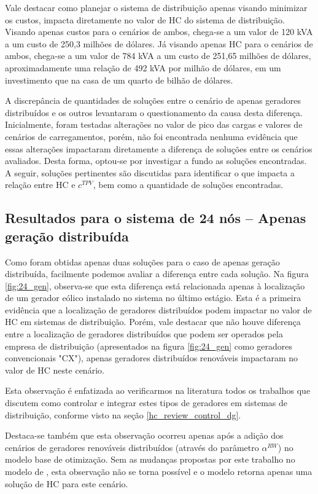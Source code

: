 Vale destacar como planejar o sistema de distribuição apenas visando minimizar os custos, impacta diretamente no valor de \ac{HC} do sistema de distribuição. Visando apenas custos para o cenários de ambos, chega-se a um valor de 120 kVA a um custo de 250,3 milhões de dólares. Já visando apenas \ac{HC} para o cenários de ambos, chega-se a um valor de 784 kVA a um custo de 251,65 milhões de dólares, aproximadamente uma relação de 492 kVA por milhão de dólares, em um investimento que na casa de um quarto de bilhão de dólares.


A discrepância de quantidades de soluções entre o cenário de apenas geradores distribuídos e os outros levantaram o questionamento da causa desta diferença. Inicialmente, foram testadas alterações no valor de pico das cargas e valores de cenários de carregamentos, porém, não foi encontrada nenhuma evidência que essas alterações impactaram diretamente a diferença de soluções entre os cenários avaliados. Desta forma, optou-se por investigar a fundo as soluções encontradas. A seguir, soluções pertinentes são discutidas para identificar o que impacta a relação entre \ac{HC} e $c^{TPV}$, bem como a quantidade de soluções encontradas.

\newpage
\subsection{Resultados para o sistema de 24 nós -- Apenas geração distribuída}

Como foram obtidas apenas duas soluções para o caso de apenas geração distribuída, facilmente podemos avaliar a diferença entre cada solução. Na figura \ref{fig:24_gen}, observa-se que esta diferença está relacionada apenas à localização de um gerador eólico instalado no sistema no último estágio.
Esta é a primeira evidência que a localização de geradores distribuídos podem impactar no valor de \ac{HC} em sistemas de distribuição. Porém, vale destacar que não houve diferença entre a localização de geradores distribuídos que podem ser operados pela empresa de distribuição (apresentados na figura \ref{fig:24_gen} como geradores convencionais "CX"), apenas geradores distribuídos renováveis impactaram no valor de \ac{HC} neste cenário.

Esta observação é enfatizada ao verificarmos na literatura todos os trabalhos que discutem como controlar e integrar estes tipos de geradores em sistemas de distribuição, conforme visto na seção \ref{hc_review_control_dg}.

Destaca-se também que esta observação ocorreu apenas após a adição dos cenários de geradores renováveis distribuídos (através do parâmetro $\alpha^{RW}$) no modelo base de otimização. Sem as mudanças propostas por este trabalho no modelo de , esta observação não se torna possível e o modelo retorna apenas uma solução de \ac{HC} para este cenário.
\newpage


